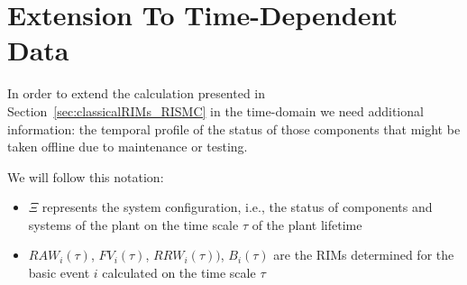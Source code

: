 \section{Extension To Time-Dependent Data}
\label{sec:timeDepRIMs}

In order to extend the calculation presented in Section~\ref{sec:classicalRIMs_RISMC} in the time-domain we need 
additional information: the temporal profile of the status of those components 
that might be taken offline due to maintenance or testing.

We will follow this notation:
\begin{itemize}
  \item $\Xi$ represents the system configuration, i.e.,  the status of components 
              and systems of the plant on the time scale $\tau$ of the plant lifetime
  \item $RAW_i(\tau)$, $FV_i(\tau)$, $RRW_i(\tau))$, $B_i(\tau)$ are the RIMs determined 
        for the basic event $i$ calculated on the time scale $\tau$
\end{itemize}

